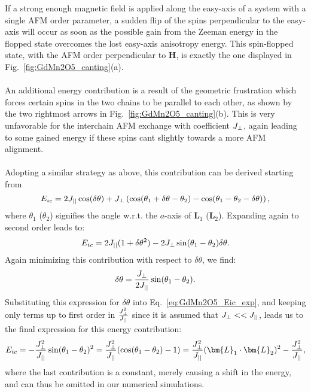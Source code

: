 If a strong enough magnetic field is applied along the easy-axis of a system with a single AFM order parameter, a sudden flip of the spins perpendicular to the easy-axis will occur as soon as the possible gain from the Zeeman energy in the flopped state overcomes the lost easy-axis anisotropy energy. This spin-flopped state, with the AFM order perpendicular to $\bm{H}$, is exactly the one displayed in Fig.~\ref{fig:GdMn2O5_canting}(a).
\\\\
An additional energy contribution is a result of the geometric frustration which forces certain spins in the two chains to be parallel to each other, as shown by the two rightmost arrows in Fig.~\ref{fig:GdMn2O5_canting}(b).
This is very unfavorable for the interchain AFM exchange with coefficient $J_{\perp}$, again leading to some gained energy if these spins cant slightly towards a more AFM alignment.
\\\\
Adopting a similar strategy as above, this contribution can be derived starting from
\begin{equation}
	E_{ic} = 2 J_{||} \cos(\delta \theta) + J_{\perp} \left(\cos(\theta_1 + \delta \theta - \theta_2) - \cos(\theta_1 - \theta_2 -\delta \theta)\right),
\end{equation}
where $\theta_1$ ($\theta_2$) signifies the angle w.r.t. the $a$-axis of $\bm{L}_1$ ($\bm{L}_2$).
Expanding again to second order leads to:
\begin{equation}
	E_{ic} = 2 J_{||} ( 1+ \delta \theta^2) - 2 J_{\perp} \sin(\theta_1 - \theta_2)\delta \theta. \label{eq:GdMn2O5_Eic_exp}
\end{equation}
Again minimizing this contribution with respect to $\delta \theta$, we find:
\begin{equation}
	\delta \theta = \frac{J_{\perp}}{2 J_{||}} \sin(\theta_1 - \theta_2).
\end{equation}
Substituting this expression for $\delta \theta$ into Eq.~\eqref{eq:GdMn2O5_Eic_exp}, and keeping only terms up to first order in $\frac{J_{\perp}^2}{J_{||}}$ since it is assumed that $J_{\perp} << J_{||}$, leads us to the final expression for this energy contribution:
\begin{equation}
	E_{ic} = -\frac{\Jperp^2}{\Jpar}\sin(\theta_1 - \theta_2)^2 =  \frac{\Jperp^2}{\Jpar}(\cos(\theta_1 - \theta_2) - 1) = \frac{\Jperp^2}{\Jpar}(\bm{L}_1 \cdot \bm{L}_2)^2 - \frac{\Jperp^2}{\Jpar},
\end{equation}
where the last contribution is a constant, merely causing a shift in the energy, and can thus be omitted in our numerical simulations.
